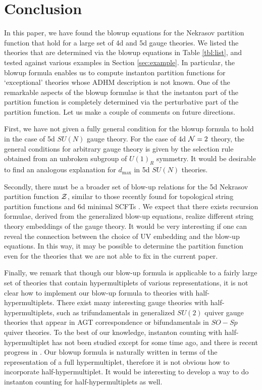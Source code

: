 \documentclass[letterpaper, 11pt]{article}
\def\CN{{\cal N}}
\def\CZ{{\cal Z}}
\begin{document}
{\section{Conclusion} \label{sec:conclusion}

In this paper, we have found the blowup equations for the Nekrasov partition function that hold for a large set of 4d and 5d gauge theories. 
We listed the theories that are determined via the blowup equations in Table \ref{tbl:list}, and tested against various examples in Section \ref{sec:example}. In particular, the blowup formula enables us to compute instanton partition functions for `exceptional' theories whose ADHM description is not known. 
One of the remarkable aspects of the blowup formulae is that the instanton part of the partition function is completely determined via the perturbative part of the partition function. Let us make a couple of comments on future directions. 

First, we have not given a fully general condition for the blowup formula to hold in the case of 5d $SU(N)$ gauge theory. For the case of 4d $\CN=2$ theory, the general conditions for arbitrary gauge theory is given by the selection rule obtained from an unbroken subgroup of $U(1)_R$ symmetry. It would be desirable to find an analogous explanation for $d_{\text{max}}$ in 5d $SU(N)$ theories. 

Secondly, there must be a broader set of blow-up relations for the 5d Nekrasov partition function $\CZ$, similar to those recently found for topological string partition functions and 6d minimal SCFTs \cite{Grassi:2016nnt, Gu:2017ccq, Huang:2017mis, Gu:2018gmy,Gu:2019dan}. We expect that there exists recursion formulae, derived from the generalized blow-up equations, realize different string theory embeddings of the gauge theory. It would be very interesting if one can reveal the connection between the choice of UV embedding and the blow-up equations. In this way, it may be possible to determine the partition function even for the theories that we are not able to fix in the current paper. 

Finally, we remark that though our blow-up formula is applicable to a fairly large set of theories that contain hypermultiplets of various representations, it is not clear how to implement our blow-up formula to theories with half-hypermultiplets.  There exist many interesting gauge theories with half-hypermultiplets, such as trifundamentals in generalized $SU(2)$ quiver gauge theories \cite{Gaiotto:2009we} that appear in AGT correspondence \cite{Alday:2009aq} or bifundamentals in $SO-Sp$ quiver theories. To the best of our knowledge, instanton counting with half-hypermultiplet has not been studied except for \cite{Hollands:2010xa, Hollands:2011zc} some time ago, and there is recent progress in \cite{Coman:2019eex}. Our blowup formula is naturally written in terms of the representation of a full hypermultiplet, therefore it is not obvious how to incorporate half-hypermultiplet. It would be interesting to develop a way to do instanton counting for half-hypermultiplets as well. 


}
\end{document}
